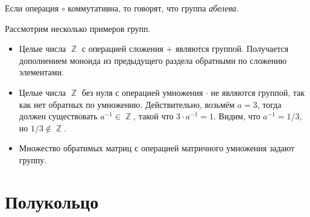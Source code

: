 \begin{definition}
    Если операция $\circ$ коммутативна, то говорят, что группа \emph{абелева}.
\end{definition}

\begin{example}
    Рассмотрим несколько примеров групп.
    \begin{itemize}
        \item Целые числа $\BbbZ$ с операцией сложения $+$ являются группой.
              Получается дополнением моноида из предыдущего раздела обратными по сложению элементами.
        \item Целые числа $\BbbZ$ без нуля%
              с операцией умножения $\cdot$ не являются группой, так как нет обратных по умножению.
              Действительно, возьмём $a = 3$, тогда должен существовать $a^{-1} \in \BbbZ$, такой что $3 \cdot a^{-1} = 1$.
              Видим, что $a^{-1} = 1/3$, но $1/3 \notin \BbbZ$.
        \item Множество обратимых%
              матриц с операцией матричного умножения задают группу.
    \end{itemize}
\end{example}

\section{Полукольцо}

